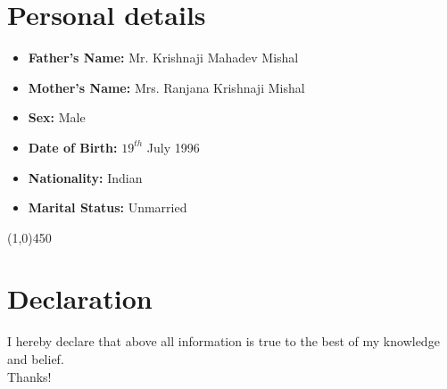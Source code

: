 \documentclass[10pt]{article}
\begin{document}
\section{Personal details}
\begin{itemize}
	\item \textbf{Father's Name:} Mr. Krishnaji Mahadev Mishal
	\item \textbf{Mother's Name:} Mrs. Ranjana Krishnaji Mishal
	\item \textbf{Sex:} Male
	\item\textbf{Date of Birth:} $19^{th}$ July 1996
	\item \textbf{Nationality:} Indian
	\item\textbf{Marital Status:} Unmarried
\end{itemize}

\begin{center}
	\line(1,0){450}
\end{center}
\section{Declaration}
I hereby declare that above all information is true to the best of my knowledge and belief.\\
Thanks!\\
\end{document}

